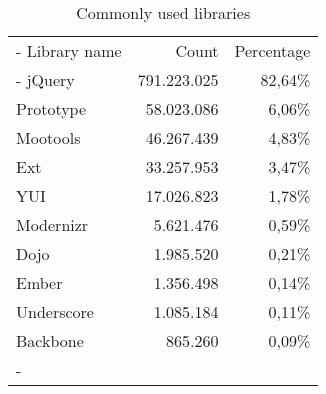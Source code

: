 \begin{table}
	\begin{tabu} to \columnwidth{ |X|r|r|}
		\tabucline-
		\rowfont{\bfseries}
		Library name & Count & Percentage\\
		\tabucline-
		jQuery		&	791.223.025	&	82,64\% \\
		Prototype	&	58.023.086	&	6,06\% \\
		Mootools 	&	46.267.439	&	4,83\% \\
		Ext			&	33.257.953	&	3,47\% \\
		YUI 		&	17.026.823	&	1,78\% \\
		Modernizr 	&	5.621.476	&	0,59\% \\
		Dojo		&	1.985.520	&	0,21\% \\
		Ember 		&	1.356.498	&	0,14\% \\
		Underscore	&	1.085.184	&	0,11\% \\
		Backbone 	&	865.260		&	0,09\% \\
		\tabucline-
	\end{tabu}
	\caption{Commonly used libraries\label{tab:commonly_used_libraries}}
\end{table}